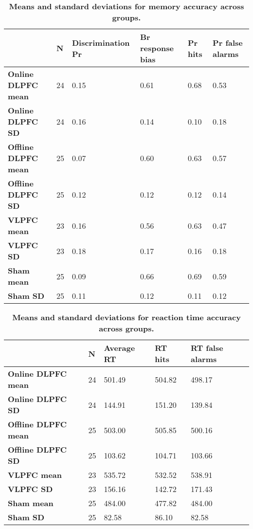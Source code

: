 \documentclass[10pt,letterpaper]{article}
\begin{document}
\begin{table}[h!]
	\caption{\label{tab:memory}\textbf{Means and standard deviations for memory accuracy across groups.}}
	\begin{tabular}{|p{3cm}|p{0.3cm}|p{2.5cm}|p{2.2cm}|p{1.3cm}|p{1.5cm}|}
 \hline
  &   \textbf{N} &  \textbf{Discrimination Pr} &  \textbf{Br response bias} &  \textbf{Pr hits} &  \textbf{Pr false alarms} \\
 \hline
\textbf{Online DLPFC mean} &  24 &               0.15 &              0.61 &     0.68 &             0.53 \\ \hline
\textbf{Online DLPFC SD} &  24 &               0.16 &              0.14 &     0.10 &             0.18 \\ \hline
\textbf{Offline DLPFC mean} &  25 &               0.07 &              0.60 &     0.63 &             0.57 \\ \hline
\textbf{Offline DLPFC SD} &  25 &               0.12 &              0.12 &     0.12 &             0.14 \\ \hline
\textbf{VLPFC mean} &  23 &               0.16 &              0.56 &     0.63 &             0.47 \\ \hline
\textbf{VLPFC SD} &  23 &               0.18 &              0.17 &     0.16 &             0.18 \\ \hline
\textbf{Sham mean} &  25 &               0.09 &              0.66 &     0.69 &             0.59 \\ \hline
\textbf{Sham SD} &  25 &               0.11 &              0.12 &     0.11 &             0.12 \\ \hline
\bottomrule
\end{tabular}	
\end{table}

\begin{table}[h!]
	\caption{\label{tab:reaction}\textbf{Means and standard deviations for reaction time accuracy across groups.}}
\begin{tabular}{|p{3.4cm}|p{0.5cm}|p{2.5cm}|p{2.2cm}|p{2.5cm}|}
\hline
 &   \textbf{N} &  \textbf{Average RT} &  \textbf{RT hits} &  \textbf{RT false alarms} \\
\hline
\textbf{Online DLPFC mean} &  24 &      501.49 &   504.82 &           498.17 \\ \hline
\textbf{Online DLPFC SD} &  24 &      144.91 &   151.20 &           139.84 \\ \hline
\textbf{Offline DLPFC mean} &  25 &      503.00 &   505.85 &           500.16 \\ \hline
\textbf{Offline DLPFC SD} &  25 &      103.62 &   104.71 &           103.66 \\ \hline
\textbf{VLPFC mean} &  23 &      535.72 &   532.52 &           538.91 \\ \hline
\textbf{VLPFC SD} &  23 &      156.16 &   142.72 &           171.43 \\ \hline
\textbf{Sham mean} &  25 &      484.00 &   477.82 &           484.00 \\ \hline
\textbf{Sham SD} &  25 &       82.58 &    86.10 &            82.58 \\
\hline
\end{tabular}
\end{table}
\end{document}
